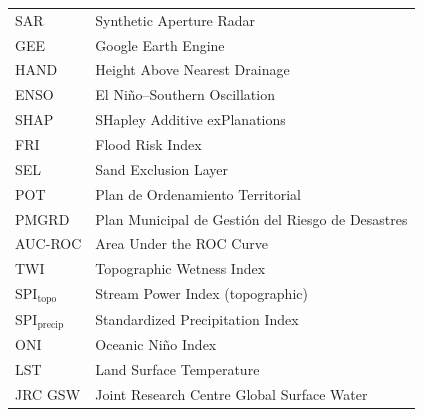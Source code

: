 \documentclass{article}
\begin{document}
\noindent
\begin{tabular}{@{}ll}
SAR & Synthetic Aperture Radar\\
GEE & Google Earth Engine\\
HAND & Height Above Nearest Drainage\\
ENSO & El Ni\~no--Southern Oscillation\\
SHAP & SHapley Additive exPlanations\\
FRI & Flood Risk Index\\
SEL & Sand Exclusion Layer\\
POT & Plan de Ordenamiento Territorial\\
PMGRD & Plan Municipal de Gesti\'on del Riesgo de Desastres\\
AUC-ROC & Area Under the ROC Curve\\
TWI & Topographic Wetness Index\\
SPI$_{\text{topo}}$ & Stream Power Index (topographic)\\
SPI$_{\text{precip}}$ & Standardized Precipitation Index\\
ONI & Oceanic Ni\~no Index\\
LST & Land Surface Temperature\\
JRC GSW & Joint Research Centre Global Surface Water
\end{tabular}




\end{document}
